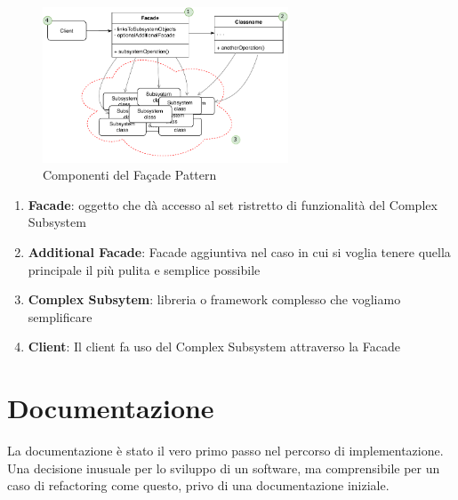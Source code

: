 \begin{figure}[H]
    \centering
    \includegraphics[width=0.65\textwidth]{images/03_1_facade_pattern.pdf}
    \caption{Componenti del Façade Pattern}
    \label{fig:facadepattern}
\end{figure}

\begin{enumerate}
    \item \textbf{Facade}: oggetto che dà accesso al set ristretto di funzionalità del Complex Subsystem
    \item \textbf{Additional Facade}: Facade aggiuntiva nel caso in cui si voglia tenere quella principale il più pulita e semplice possibile
    \item \textbf{Complex Subsytem}: libreria o framework complesso che vogliamo semplificare
    \item \textbf{Client}: Il client fa uso del Complex Subsystem attraverso la Facade
\end{enumerate}

\section{Documentazione}
La documentazione è stato il vero primo passo nel percorso di implementazione. Una decisione inusuale per lo sviluppo di un software, ma comprensibile per un caso di refactoring come questo, privo di una documentazione iniziale. 

